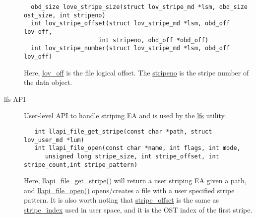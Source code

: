\begin{description}
  \begin{Verbatim}
  obd_size love_stripe_size(struct lov_stripe_md *lsm, obd_size ost_size, int stripeno)
  int lov_stripe_offset(struct lov_stripe_md *lsm, obd_off lov_off, 
                     int stripeno, obd_off *obd_off)  
  int lov_stripe_number(struct lov_stripe_md *lsm, obd_off lov_off)
  \end{Verbatim}

  Here, \url{lov_off} is the file logical offset. The \url{stripeno} is the stripe number
  of the data object. 

  \item[lfs API] User-level API to handle striping EA and is used by the \url{lfs}
  utility.

  \begin{Verbatim}
   int llapi_file_get_stripe(const char *path, struct lov_user_md *lum)
   int llapi_file_open(const char *name, int flags, int mode, 
      unsigned long stripe_size, int stripe_offset, int stripe_count,int stripe_pattern)
   \end{Verbatim} 

    Here, \url{llapi_file_get_stripe()} will return a user striping EA given a path, and
    \url{llapi_file_open()} opens/creates a file with a user specified stripe
    pattern. It is also worth noting that \url{stripe_offset} is the same as
    \url{stripe_index} used in user space, and it is the OST index of the first
    stripe.
    
\end{description}

